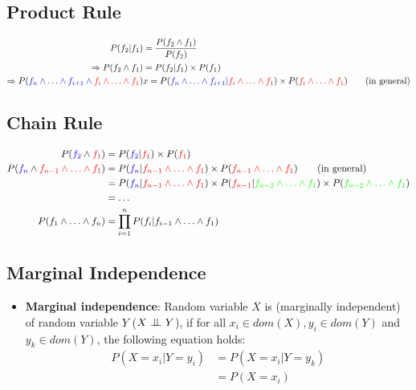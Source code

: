\documentclass{article}
\newcommand{\bigCI}{\mathrel{\text{\scalebox{1.07}{$\perp\mkern-10mu\perp$}}}}
\begin{document}
\subsection{Product Rule}

\begin{align*}
    P(f_2|f_1) &= \frac{P(f_2 \wedge f_1)}{P(f_2)} \\
    \Rightarrow P(f_2 \wedge f_1) &=  P(f_2|f_1) \times P(f_1) \\
    \Rightarrow P(\textcolor{blue}{f_n \wedge \ldots \wedge f_{i + 1} \wedge \textcolor{red}{f_i \wedge \ldots \wedge f_1}}) &x= P(\textcolor{blue}{f_n \wedge \ldots \wedge f_{i + 1} | \textcolor{red}{f_i \wedge \ldots \wedge f_1}}) \times P(\textcolor{red}{f_i \wedge \ldots \wedge f_1}) \tag{in general}
\end{align*}

\subsection{Chain Rule}

\begin{align*}
    P(\textcolor{blue}{f_2} \wedge \textcolor{red}{f_1}) &= P(\textcolor{blue}{f_2}|\textcolor{red}{f_1}) \times P(\textcolor{red}{f_1}) \\
    P(\textcolor{blue}{f_n} \wedge \textcolor{red}{f_{n-1} \wedge \ldots \wedge f_1}) &= P(\textcolor{blue}{f_n} | \textcolor{red}{f_{n-1} \wedge \ldots \wedge f_1}) \times P(\textcolor{red}{f_{n-1} \wedge \ldots \wedge f_1}) \tag{in general} \\
    &= P(\textcolor{blue}{f_n} | \textcolor{red}{f_{n-1} \wedge \ldots \wedge f_1}) \times P(\textcolor{red}{f_{n-1}} | \textcolor{green}{f_{n-2} \wedge \ldots \wedge f_1}) \times P(\textcolor{green}{f_{n-2} \wedge \ldots \wedge f_1}) \\
    &= \ldots \\
    P(f_1 \wedge \ldots \wedge f_n) &= \prod\limits_{i = 1}^{n} P(f_i|f_{i - 1} \wedge \ldots \wedge f_1)
\end{align*}

\subsection{Marginal Independence}

\begin{itemize}
    \item \textbf{Marginal independence}: Random variable $X$ is (marginally independent) of random variable $Y$ ($X \bigCI Y$), if for all $x_i \in dom(X), y_i \in dom(Y)$ and $y_k \in dom(Y)$, the following equation holds:
    \begin{align*}
        P(X = x_i|Y = y_i) &=  P(X = x_i|Y = y_k) \\
        &= P(X = x_i)
    \end{align*}
\end{itemize}
\end{document}
